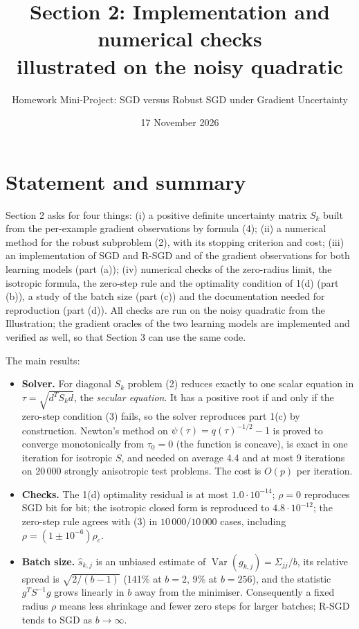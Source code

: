 \documentclass[11pt,a4paper]{article}
\title{Section 2: Implementation and numerical checks\\[0.2em]
\large illustrated on the noisy quadratic}
\author{Homework Mini-Project: SGD versus Robust SGD under Gradient Uncertainty}
\date{17 November 2026}
\DeclareMathOperator{\Var}{Var}
\begin{document}
\maketitle

\section*{Statement and summary}

Section 2 asks for four things: (i) a positive definite uncertainty matrix $S_k$
built from the per-example gradient observations by formula (4); (ii) a numerical
method for the robust subproblem (2), with its stopping criterion and cost;
(iii) an implementation of SGD and R-SGD and of the gradient observations for both
learning models (part (a)); (iv) numerical checks of the zero-radius limit, the
isotropic formula, the zero-step rule and the optimality condition of 1(d)
(part (b)), a study of the batch size (part (c)) and the documentation needed for
reproduction (part (d)). All checks are run on the noisy quadratic from the
Illustration; the gradient oracles of the two learning models are implemented and
verified as well, so that Section 3 can use the same code.

The main results:
\begin{itemize}
\item \textbf{Solver.} For diagonal $S_k$ problem (2) reduces exactly to one scalar
equation in $\tau=\sqrt{d^TS_kd}$, the \emph{secular equation}. It has a positive
root if and only if the zero-step condition (3) fails, so the solver reproduces
part 1(c) by construction. Newton's method on $\psi(\tau)=q(\tau)^{-1/2}-1$ is proved
to converge monotonically from $\tau_0=0$ (the function is concave), is exact in one
iteration for isotropic $S$, and needed on average 4.4 and at most 9 iterations on
20\,000 strongly anisotropic test problems. The cost is $O(p)$ per iteration.
\item \textbf{Checks.} The 1(d) optimality residual is at most $1.0\cdot10^{-14}$;
$\rho=0$ reproduces SGD bit for bit; the isotropic closed form is reproduced to
$4.8\cdot10^{-12}$; the zero-step rule agrees with (3) in $10\,000/10\,000$ cases,
including $\rho=(1\pm10^{-6})\rho_c$.
\item \textbf{Batch size.} $\widehat s_{k,j}$ is an unbiased estimate of
$\Var(g_{k,j})=\Sigma_{jj}/b$, its relative spread is $\sqrt{2/(b-1)}$ (141\% at
$b=2$, 9\% at $b=256$), and the statistic $g^TS^{-1}g$ grows linearly in $b$ away
from the minimiser. Consequently a fixed radius $\rho$ means less shrinkage and
fewer zero steps for larger batches; R-SGD tends to SGD as $b\to\infty$.
\end{itemize}
\end{document}

